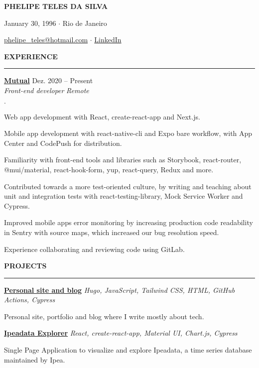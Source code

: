\documentclass[12pt,letterpaper]{article}
\newenvironment{tightlist}
  {\begin{list}
    {$\cdot$}
    {
      \setlength{\leftmargin}{0em}
      \setlength{\itemsep}{-\smallskipamount}
    }
  }
{\end{list}}
\begin{document}
\pagestyle{empty}

\centerline{\huge\bf PHELIPE TELES DA SILVA}
\medskip

\centerline{January 30, 1996 $\cdot$ Rio de Janeiro}
\smallskip

\centerline{
  \href{mailto:phelipe_teles@hotmail.com}{phelipe\_teles@hotmail.com}
  $\cdot$
  \href{https://linkedin.com/in/phelipeteles}{LinkedIn}
}
\smallskip

\medskip \textbf{EXPERIENCE} \medskip
\hrule

\textbf{\href{https://mutual.club}{Mutual}} \hfill Dez. 2020 -- Present \\
\emph{Front-end developer} \hfill \emph{Remote} {\parfillskip=0pt\par}

\begin{tightlist}
  \item Web app development with React, create-react-app and Next.js.
  \item Mobile app development with react-native-cli and Expo bare workflow,
    with App Center and CodePush for distribution.
  \item Familiarity with front-end tools and libraries such as Storybook,
    react-router, @mui/material, react-hook-form, yup, react-query, Redux and
    more.
  \item Contributed towards a more test-oriented culture, by writing and
    teaching about unit and integration tests with react-testing-library,
    Mock Service Worker and Cypress.
  \item Improved mobile apps error monitoring by increasing production code readability in
    Sentry with source maps, which increased our bug resolution speed.
  \item Experience collaborating and reviewing code using GitLab.
\end{tightlist}

\medskip \textbf{PROJECTS} \medskip
\hrule

\textbf{\href{https://phelipetls.github.io}{Personal site and blog}} \hfill \emph{Hugo, JavaScript, Tailwind CSS, HTML, GitHub Actions, Cypress}
{\parfillskip=0pt\par}
Personal site, portfolio and blog where I write mostly about tech.

\smallskip

\textbf{\href{http://ipeadata-explorer.surge.sh}{Ipeadata Explorer}} \hfill \emph{React, create-react-app, Material UI, Chart.js, Cypress}
{\parfillskip=0pt\par}
Single Page Application to visualize and explore Ipeadata, a time series database maintained by Ipea.
\end{document}

